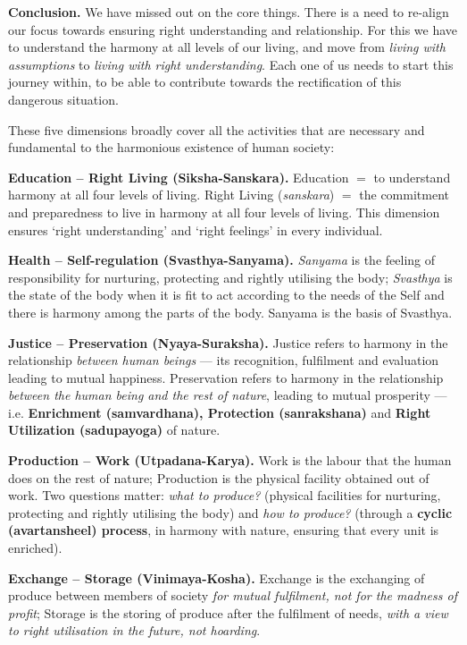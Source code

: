 \textbf{Conclusion.} We have missed out on the core things. There is a need to
re-align our focus towards ensuring right understanding and relationship. For
this we have to understand the harmony at all levels of our living, and move
from \emph{living with assumptions} to \emph{living with right
understanding}. Each one of us needs to start this journey within, to be able
to contribute towards the rectification of this dangerous situation.


\ans These five dimensions broadly cover all the activities that are necessary
and fundamental to the harmonious existence of human society:

\begin{apts}
\item \textbf{Education -- Right Living (Siksha-Sanskara).} Education $=$ to
      understand harmony at all four levels of living. Right Living
      (\emph{sanskara}) $=$ the commitment and preparedness to live in harmony
      at all four levels of living. This dimension ensures `right
      understanding' and `right feelings' in every individual.
\item \textbf{Health -- Self-regulation (Svasthya-Sanyama).} \emph{Sanyama} is
      the feeling of responsibility for nurturing, protecting and rightly
      utilising the body; \emph{Svasthya} is the state of the body when it is
      fit to act according to the needs of the Self and there is harmony among
      the parts of the body. Sanyama is the basis of Svasthya.
\item \textbf{Justice -- Preservation (Nyaya-Suraksha).} Justice refers to
      harmony in the relationship \emph{between human beings} --- its
      recognition, fulfilment and evaluation leading to mutual happiness.
      Preservation refers to harmony in the relationship \emph{between the
      human being and the rest of nature}, leading to mutual prosperity ---
      i.e. \textbf{Enrichment (samvardhana), Protection (sanrakshana)} and
      \textbf{Right Utilization (sadupayoga)} of nature.
\item \textbf{Production -- Work (Utpadana-Karya).} Work is the labour that
      the human does on the rest of nature; Production is the physical
      facility obtained out of work. Two questions matter: \emph{what to
      produce?} (physical facilities for nurturing, protecting and rightly
      utilising the body) and \emph{how to produce?} (through a
      \textbf{cyclic (avartansheel) process}, in harmony with nature, ensuring
      that every unit is enriched).
\item \textbf{Exchange -- Storage (Vinimaya-Kosha).} Exchange is the
      exchanging of produce between members of society \emph{for mutual
      fulfilment, not for the madness of profit}; Storage is the storing of
      produce after the fulfilment of needs, \emph{with a view to right
      utilisation in the future, not hoarding}.
\end{apts}

